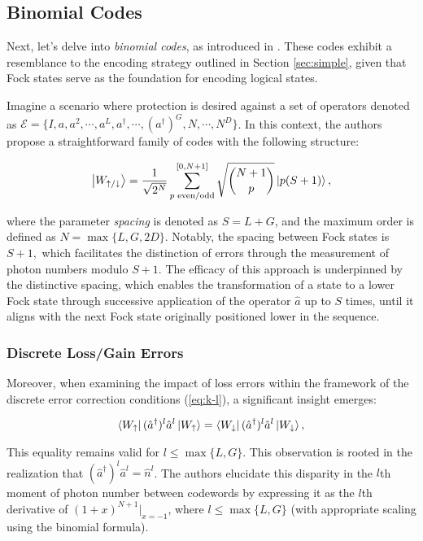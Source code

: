 \documentclass[11pt]{article}
\newcommand\0{\mathbf{0}}
\newcommand\<{\langle}
\renewcommand\>{\rangle}
\begin{document}
\subsection{Binomial Codes}

Next, let's delve into \emph{binomial codes}, as introduced in \cite{michael2016new}. These codes exhibit a resemblance to the encoding strategy outlined in Section \ref{sec:simple}, given that Fock states serve as the foundation for encoding logical states.

Imagine a scenario where protection is desired against a set of operators denoted as $\mathcal{E} = \{I, a, a^2, \cdots, a^L, a^\dag, \cdots, (a^\dag)^G, N, \cdots, N^D \}$. In this context, the authors propose a straightforward family of codes with the following structure:

\[
\ket{W_{\uparrow / \downarrow}} = \frac{1}{\sqrt{2^N}} \sum_{ p\text{ even/odd}}^{[0, N+1]} \sqrt{\binom{N+1}{ p }} \ket{p(S+1)},
\]

where the parameter \emph{spacing} is denoted as $S = L+G$, and the maximum order is defined as $N = \max\{L, G, 2D\}$. Notably, the spacing between Fock states is $S+1,$ which facilitates the distinction of errors through the measurement of photon numbers modulo $S+1$. The efficacy of this approach is underpinned by the distinctive spacing, which enables the transformation of a state to a lower Fock state through successive application of the operator $\hat{a}$ up to $S$ times, until it aligns with the next Fock state originally positioned lower in the sequence.


\subsubsection{Discrete Loss/Gain Errors}

 Moreover, when examining the impact of loss errors within the framework of the discrete error correction conditions (\ref{eq:k-l}), a significant insight emerges:

\[
\bra{W_\uparrow}(\hat{a}^\dag)^l\hat{a}^l \ket{W_{\uparrow}} = \bra{W_\downarrow}(\hat{a}^\dag)^l\hat{a}^l \ket{W_{\downarrow}},
\]

This equality remains valid for \(l \leq \max\{L, G\}\). This observation is rooted in the realization that \((\hat{a}^\dag)^l\hat{a}^l = \hat{n}^l\). The authors elucidate this disparity in the \(l\)th moment of photon number between codewords by expressing it as the \(l\)th derivative of \((1+x)^{N+1}\vert_{x=-1}\), where \(l \leq \max\{L, G\}\) (with appropriate scaling using the binomial formula).
\end{document}
